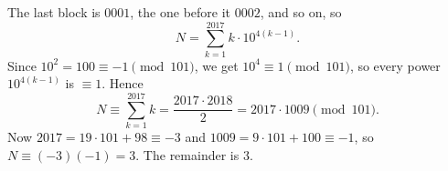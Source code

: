 The last block is $0001$, the one before it $0002$, and so on, so
\[
N=\sum_{k=1}^{2017}k\cdot10^{4(k-1)} .
\]
Since $10^2=100\equiv-1\pmod{101}$, we get $10^4\equiv1\pmod{101}$, so every power $10^{4(k-1)}$ is $\equiv1$. Hence
\[
N\equiv\sum_{k=1}^{2017}k=\dfrac{2017\cdot2018}{2}=2017\cdot1009\pmod{101}.
\]
Now $2017=19\cdot101+98\equiv-3$ and $1009=9\cdot101+100\equiv-1$, so $N\equiv(-3)(-1)=3$. The remainder is $\boxed{3}$.
